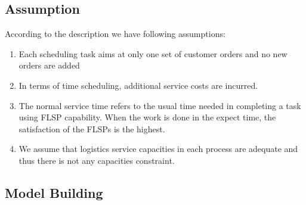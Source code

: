 \documentclass[12pt,a4paper]{article}
\begin{document}
\subsection{Assumption}
According to the description we have following assumptions:
\begin{enumerate}
\item Each scheduling task aims at only one set of customer orders and no new orders are added
\item In terms of time scheduling, additional service costs are incurred.
\item The normal service time refers to the usual time needed in completing a task using FLSP capability. When the work is done in the expect time, the satisfaction of the FLSPs is the highest.
\item We assume that logistics service capacities in each process are adequate and thus there is not any capacities constraint.
\end{enumerate}

\subsection{Model Building}
\end{document}
